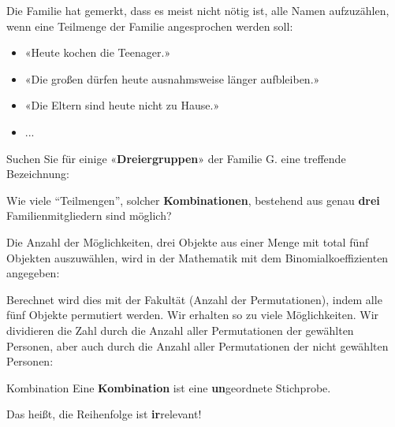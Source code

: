 Die Familie hat gemerkt, dass es meist nicht nötig ist, alle Namen
aufzuzählen, wenn eine Teilmenge der Familie angesprochen werden soll:

\begin{itemize}
\item «Heute kochen die Teenager.»
\item «Die großen dürfen heute ausnahmsweise länger aufbleiben.»
\item «Die Eltern sind heute nicht zu Hause.»
  \item ...
\end{itemize}


Suchen Sie für einige «\textbf{Dreiergruppen}» der Familie G. eine treffende Bezeichnung:




Wie viele ``Teilmengen'', solcher \textbf{Kombinationen}, bestehend aus genau \textbf{drei} Familienmitgliedern sind möglich?



Die Anzahl der Möglichkeiten, drei Objekte aus einer Menge mit total
fünf Objekten auszuwählen, wird in der Mathematik mit dem
Binomialkoeffizienten angegeben:


Berechnet wird dies mit der Fakultät (Anzahl der Permutationen), indem
alle fünf Objekte permutiert werden. Wir erhalten so zu viele
Möglichkeiten. Wir dividieren die Zahl durch die Anzahl aller Permutationen der
gewählten Personen, aber auch durch die Anzahl aller Permutationen der
nicht gewählten Personen:


\begin{definition}{Kombination}{}
  Eine \textbf{Kombination} ist eine \textbf{un}geordnete Stichprobe.

  Das heißt, die Reihenfolge ist \textbf{ir}relevant!
\end{definition}

